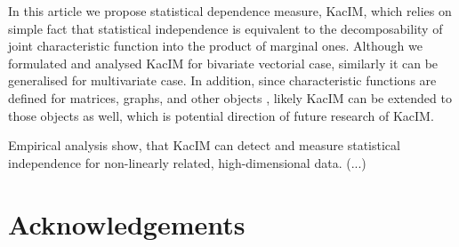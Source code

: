 \documentclass{article}
\begin{document}
\label{section:discussion}
In this article we propose statistical dependence measure, KacIM, which relies on simple fact that statistical independence is equivalent to the decomposability of joint characteristic function  into the product of marginal ones. Although we formulated and analysed KacIM for bivariate vectorial case, similarly it can be generalised for multivariate case. In addition, since characteristic functions are defined for matrices, graphs, and other objects \cite{?}, likely KacIM can be extended to those objects as well, which is potential direction of future research of KacIM.

Empirical analysis show, that KacIM can detect and measure statistical independence for non-linearly related, high-dimensional data. (...)

\section{Acknowledgements}




%


{\footnotesize
}


\end{document}
